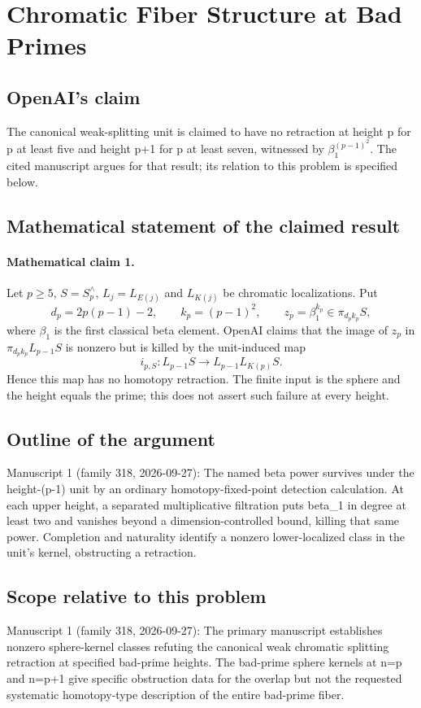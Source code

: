 \documentclass[11pt]{article}
\begin{document}
\section*{Chromatic Fiber Structure at Bad Primes}

\subsection{OpenAI's claim}
The canonical weak-splitting unit is claimed to have no retraction at height p for p at least five and height p+1 for p at least seven, witnessed by \(\beta_1^{(p-1)^2}\). The cited manuscript argues for that result; its relation to this problem is specified below.

\subsection{Mathematical statement of the claimed result}
\paragraph{Mathematical claim 1.} Let $p\ge5$, $S=S_p^\wedge$, $L_j=L_{E(j)}$ and $L_{K(j)}$ be chromatic localizations. Put
\[
d_p=2p(p-1)-2,\qquad k_p=(p-1)^2,\qquad z_p=\beta_1^{k_p}\in\pi_{d_pk_p}S,
\]
where $\beta_1$ is the first classical beta element. OpenAI claims that the image of $z_p$ in $\pi_{d_pk_p}L_{p-1}S$ is nonzero but is killed by the unit-induced map
\[
i_{p,S}:L_{p-1}S\longrightarrow L_{p-1}L_{K(p)}S.
\]
Hence this map has no homotopy retraction. The finite input is the sphere and the height equals the prime; this does not assert such failure at every height.

\subsection{Outline of the argument}
Manuscript 1 (family 318, 2026-09-27): The named beta power survives under the height-(p-1) unit by an ordinary homotopy-fixed-point detection calculation. At each upper height, a separated multiplicative filtration puts beta\_1 in degree at least two and vanishes beyond a dimension-controlled bound, killing that same power. Completion and naturality identify a nonzero lower-localized class in the unit's kernel, obstructing a retraction.

\subsection{Scope relative to this problem}
Manuscript 1 (family 318, 2026-09-27): The primary manuscript establishes nonzero sphere-kernel classes refuting the canonical weak chromatic splitting retraction at specified bad-prime heights. The bad-prime sphere kernels at n=p and n=p+1 give specific obstruction data for the overlap but not the requested systematic homotopy-type description of the entire bad-prime fiber.
\end{document}
